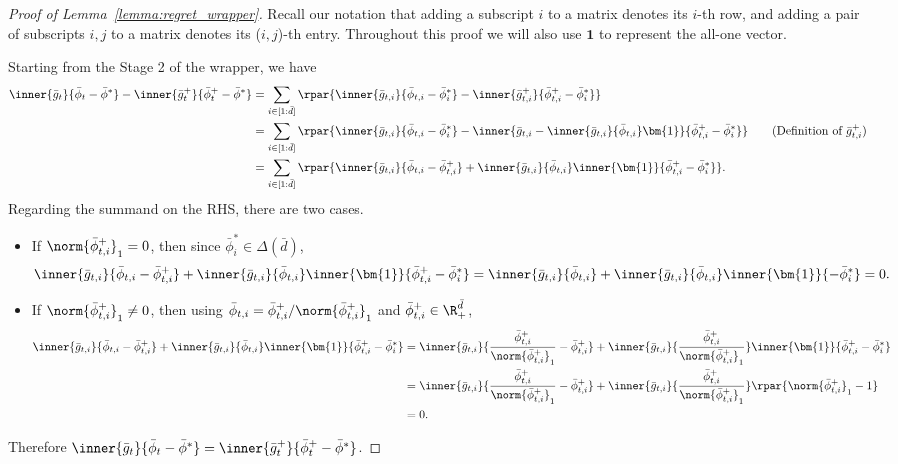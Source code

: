 \documentclass[10pt]{article}
\begin{document}
\begin{proof}[Proof of Lemma~\ref{lemma:regret_wrapper}]
Recall our notation that adding a subscript $i$ to a matrix denotes its $i$-th row, and adding a pair of subscripts $i,j$ to a matrix denotes its ($i,j$)-th entry. Throughout this proof we will also use $\bm{1}$ to represent the all-one vector. 

Starting from the Stage 2 of the wrapper, we have
\begin{align*}
\inner{\bar g_t}{\bar \phi_t-\bar \phi^*}-\inner{\bar g^+_t}{\bar \phi^+_t-\bar \phi^*}&=\sum_{i\in[1:\bar d]}\rpar{\inner{\bar g_{t,i}}{\bar \phi_{t,i}-\bar \phi^*_i}-\inner{\bar g^+_{t,i}}{\bar \phi^+_{t,i}-\bar \phi^*_i}}\\
&=\sum_{i\in[1:\bar d]}\rpar{\inner{\bar g_{t,i}}{\bar \phi_{t,i}-\bar \phi^*_i}-\inner{\bar g_{t,i}-\inner{\bar g_{t,i}}{\bar\phi_{t,i}}\bm{1}}{\bar \phi^+_{t,i}-\bar \phi^*_i}}\tag{Definition of $\bar g^+_{t,i}$}\\
&=\sum_{i\in[1:\bar d]}\rpar{\inner{\bar g_{t,i}}{\bar \phi_{t,i}-\bar \phi^+_{t,i}}+\inner{\bar g_{t,i}}{\bar\phi_{t,i}}\inner{\bm{1}}{\bar \phi^+_{t,i}-\bar \phi^*_i}}.
\end{align*}
Regarding the summand on the RHS, there are two cases. 
\begin{itemize}
\item If $\norm{\bar \phi^+_{t,i}}_1=0$, then since $\bar \phi^*_i\in\Delta(\bar d)$,
\begin{equation*}
\inner{\bar g_{t,i}}{\bar \phi_{t,i}-\bar \phi^+_{t,i}}+\inner{\bar g_{t,i}}{\bar\phi_{t,i}}\inner{\bm{1}}{\bar \phi^+_{t,i}-\bar \phi^*_i}=\inner{\bar g_{t,i}}{\bar \phi_{t,i}}+\inner{\bar g_{t,i}}{\bar\phi_{t,i}}\inner{\bm{1}}{-\bar \phi^*_i}=0.
\end{equation*}
\item If $\norm{\bar \phi^+_{t,i}}_1\neq 0$, then using $\bar \phi_{t,i}=\bar \phi^+_{t,i}/\norm{\bar \phi^+_{t,i}}_1$ and $\bar \phi^+_{t,i}\in\R_+^{\bar d}$,
\begin{align*}
\inner{\bar g_{t,i}}{\bar \phi_{t,i}-\bar \phi^+_{t,i}}+\inner{\bar g_{t,i}}{\bar\phi_{t,i}}\inner{\bm{1}}{\bar \phi^+_{t,i}-\bar \phi^*_i}&=\inner{\bar g_{t,i}}{\frac{\bar \phi^+_{t,i}}{\norm{\bar \phi^+_{t,i}}_1}-\bar \phi^+_{t,i}}+\inner{\bar g_{t,i}}{\frac{\bar\phi^+_{t,i}}{\norm{\bar \phi^+_{t,i}}_1}}\inner{\bm{1}}{\bar \phi^+_{t,i}-\bar \phi^*_i}\\
&=\inner{\bar g_{t,i}}{\frac{\bar \phi^+_{t,i}}{\norm{\bar \phi^+_{t,i}}_1}-\bar \phi^+_{t,i}}+\inner{\bar g_{t,i}}{\frac{\bar\phi^+_{t,i}}{\norm{\bar \phi^+_{t,i}}_1}}\rpar{\norm{\bar \phi^+_{t,i}}_1-1}\\
&=0.
\end{align*}
\end{itemize}
Therefore $\inner{\bar g_t}{\bar \phi_t-\bar \phi^*}=\inner{\bar g^+_t}{\bar \phi^+_t-\bar \phi^*}$.


\end{proof}
\end{document}
